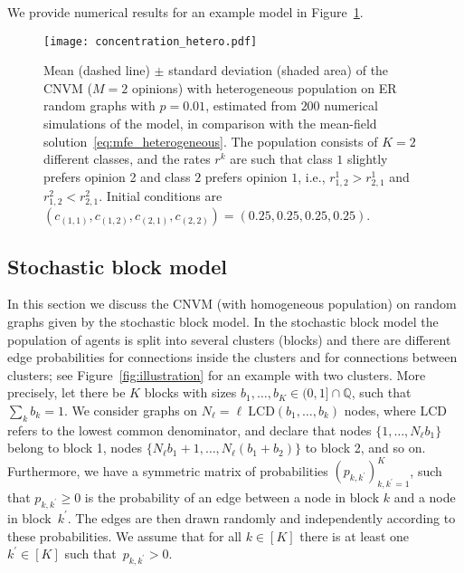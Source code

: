 \documentclass[a4paper,
               10pt,
               pdftex,
               normalheadings,
               headsepline,
               footsepline,
               headinclude,
               footinclude,
               DIV=14,
               abstracton]
{scrartcl}
\newcommand{\review}[1]{{#1}}
\begin{document}
We provide numerical results for an example model in Figure~\ref{fig:concentration_hetero}. 

\begin{figure}
    \centering
    \texttt{[image: concentration\_hetero.pdf]}
    \caption{Mean (dashed line) $\pm$ standard deviation (shaded area) of the CNVM ($M=2$ opinions) with heterogeneous population on ER random graphs with $p=0.01$, estimated from $200$ \review{numerical simulations of the model}, in comparison with the mean-field solution~\eqref{eq:mfe_heterogeneous}. The population consists of $K=2$ different classes, and the rates $r^k$ are such that class $1$ slightly prefers opinion 2 and class $2$ prefers opinion $1$, i.e., $r_{1,2}^1 > r_{2,1}^1$ and $r_{1,2}^2 < r_{2,1}^2$.
    Initial conditions are $(c_{(1,1)}, c_{(1,2)}, c_{(2,1)}, c_{(2,2)}) = (0.25, 0.25, 0.25, 0.25)$.}
    \label{fig:concentration_hetero}
\end{figure}


\subsection{Stochastic block model} \label{subsec:sbm}
In this section we discuss the CNVM (with homogeneous population) on random graphs given by the stochastic block model.
In the stochastic block model the population of agents is split into several clusters (blocks) and there are different edge probabilities for connections inside the clusters and for connections between clusters; see Figure~\ref{fig:illustration} for an example with two clusters.
More precisely, let there be $K$ blocks with sizes $b_1,\dots,b_K \in (0,1] \cap \mathbb{Q}$, such that $\sum_k b_k = 1$.
We consider graphs on $N_\ell = \ell\ \text{LCD}(b_1,\dots,b_k)$ nodes, where LCD refers to the lowest common denominator, and declare that nodes $\{1,\dots, N_\ell b_1\}$ belong to block 1, nodes $\{ N_\ell b_1 + 1,\dots, N_\ell (b_1 + b_2)\}$ to block 2, and so on.
Furthermore, we have a symmetric matrix of probabilities $(p_{k, k^\prime})_{k,k^\prime = 1}^K$, such that $p_{k, k^\prime} \geq 0$ is the probability of an edge between a node in block $k$ and a node in block~$k^\prime$. The edges are then drawn randomly and independently according to these probabilities.
We assume that for all $k \in [K]$ there is at least one $k^\prime \in [K]$ such that~$p_{k, k^\prime} > 0$.
\end{document}
